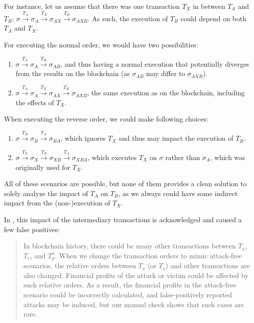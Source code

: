 \documentclass[draft,final]{vutinfth} %
\begin{document}
For instance, let us assume that there was one transaction $T_X$ in between $T_A$ and $T_B$: $\sigma \xrightarrow{T_A} \sigma_A \xrightarrow{T_X} \sigma_{AX} \xrightarrow{T_B} \sigma_{AXB}$. As such, the execution of $T_B$ could depend on both $T_A$ and $T_X$.

For executing the normal order, we would have two possibilities:

\begin{enumerate}
    \item $\sigma \xrightarrow{T_A} \sigma_A \xrightarrow{T_B} \sigma_{AB}$, and thus having a normal execution that potentially diverges from the results on the blockchain (as $\sigma_{AB}$ may differ to $\sigma_{AXB}$).
    \item $\sigma \xrightarrow{T_A} \sigma_A \xrightarrow{T_X} \sigma_{AX} \xrightarrow{T_B} \sigma_{AXB}$, the same execution as on the blockchain, including the effects of $T_X$.
\end{enumerate}

When executing the reverse order, we could make following choices:

\begin{enumerate}
    \item $\sigma \xrightarrow{T_B} \sigma_B \xrightarrow{T_A} \sigma_{BA}$, which ignores $T_X$ and thus may impact the execution of $T_B$.
    \item $\sigma \xrightarrow{T_X} \sigma_X \xrightarrow{T_B} \sigma_{XB} \xrightarrow{T_A} \sigma_{XBA}$, which executes $T_X$  on $\sigma$ rather than $\sigma_A$, which was originally used for $T_X$.
\end{enumerate}


All of these scenarios are possible, but none of them provides a clean solution to solely analyze the impact of $T_A$ on $T_B$, as we always could have some indirect impact from the (non-)execution of $T_X$.

In \cite{zhang_combatting_2023}, this impact of the intermediary transactions is acknowledged and caused a few false positives:

\begin{quote}
    In blockchain history, there could be many other transactions between $T_a$, $T_v$, and $T_p^a$. When we change the transaction orders to mimic attack-free scenarios, the relative orders between $T_a$ (or $T_v$) and other transactions are also changed. Financial profits of the attack or victim could be affected by such relative orders. As a result, the financial profits in the attack-free scenario could be incorrectly calculated, and false-positively reported attacks may be induced, but our manual check shows that such cases are rare.
\end{quote}
\end{document}
